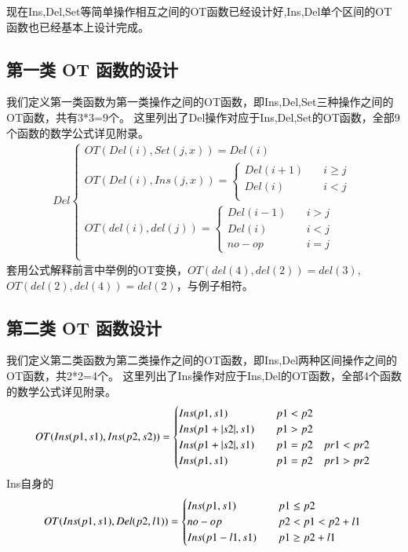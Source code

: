 现在Ins,Del,Set等简单操作相互之间的OT函数已经设计好,Ins,Del单个区间的OT函数也已经基本上设计完成。
\subsection{第一类 OT 函数的设计}
我们定义第一类函数为第一类操作之间的OT函数，即Ins,Del,Set三种操作之间的OT函数，共有3*3=9个。
这里列出了Del操作对应于Ins,Del,Set的OT函数，全部9个函数的数学公式详见附录。
\begin{equation}
\begin{aligned}
Del \begin{cases}
OT(Del (i), Set (j,x)) =
	{Del(i)}\\
OT(Del (i), Ins (j,x)) =\begin{cases}
	{Del (i+1)}  \quad &i \ge j\\
	{Del (i)}   \quad &i < j\\ \end{cases}\\
OT(del (i), del (j)) =\begin{cases}
	{Del (i-1)} \quad &i > j\\
	{Del (i)} \quad &i < j\\
	{no-op}   \quad &i = j \end{cases}\\
\end{cases}
\end{aligned}
\end{equation}
套用公式解释前言中举例的OT变换，$OT(del (4), del (2)) = del(3)$,$OT(del (2), del (4)) = del(2)$，与例子相符。

\subsection{第二类 OT 函数设计}
我们定义第二类函数为第二类操作之间的OT函数，即Ins,Del两种区间操作之间的OT函数，共2*2=4个。
这里列出了Ins操作对应于Ins,Del的OT函数，全部4个函数的数学公式详见附录。
\begin{equation}
OT(Ins(p1,s1),Ins(p2,s2))= \begin{cases}
Ins(p1,s1) \quad & p1<p2 \\
Ins(p1+ |s2|,s1) \quad & p1>p2 \\
Ins(p1+ |s2|,s1) \quad & p1=p2 \quad pr1<pr2 \\
Ins(p1,s1) \quad & p1=p2 \quad pr1>pr2
 \end{cases}\\
\end{equation}
Ins自身的
\begin{equation}
OT(Ins(p1,s1),Del(p2,l1))= \begin{cases}
Ins(p1,s1) \quad & p1 \le p2 \\
no-op \quad & p2<p1<p2+l1\\
Ins(p1-l1,s1) \quad & p1 \ge p2+l1 \end{cases}\\
\end{equation}

